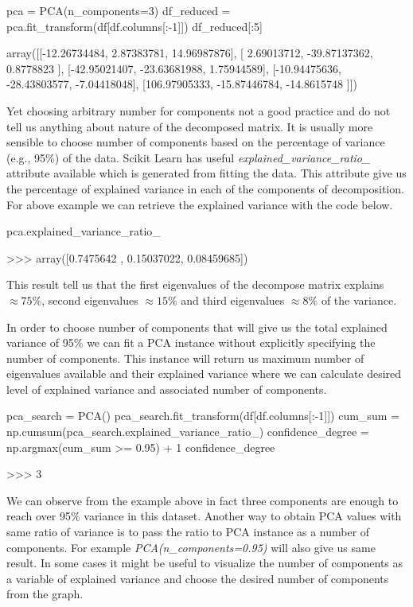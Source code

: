 \documentclass[12pt]{article}
\begin{document}
\begin{python}
    pca = PCA(n_components=3)
    df_reduced = pca.fit_transform(df[df.columns[:-1]])
    df_reduced[:5]

    array([[-12.26734484,   2.87383781,  14.96987876],
       [  2.69013712, -39.87137362,   0.8778823 ],
       [-42.95021407, -23.63681988,   1.75944589],
       [-10.94475636, -28.43803577,  -7.04418048],
       [106.97905333, -15.87446784, -14.8615748 ]])
\end{python}

Yet choosing arbitrary number for components not a good practice and do not tell us anything about nature of the decomposed matrix. It is usually more sensible to choose number of components based on the percentage of variance (e.g., 95\%) of the data. Scikit Learn has useful \textit{explained\_variance\_ratio\_} attribute available which is generated from fitting the data. This attribute give us the percentage of explained variance in each of the components of decomposition. For above example we can retrieve the explained variance with the code below.

\begin{python}
    pca.explained_variance_ratio_

    >>> array([0.7475642 , 0.15037022, 0.08459685])
\end{python}

This result tell us that the first eigenvalues of the decompose matrix explains $\approx 75\%$, second eigenvalues $\approx 15\%$ and third eigenvalues $\approx 8\%$ of the variance.

In order to choose number of components that will give us the total explained variance of 95\% we can fit a PCA instance without explicitly specifying the number of components. This instance will return us maximum number of eigenvalues available and their explained variance where we can calculate desired level of explained variance and associated number of components.

\begin{python}
    pca_search = PCA()
    pca_search.fit_transform(df[df.columns[:-1]])
    cum_sum = np.cumsum(pca_search.explained_variance_ratio_)
    confidence_degree = np.argmax(cum_sum >= 0.95) + 1
    confidence_degree

    >>> 3
\end{python}

We can observe from the example above in fact three components are enough to reach over 95\% variance in this dataset. Another way to obtain PCA values with same ratio of variance is to pass the ratio to PCA instance as a number of components. For example \textit{PCA(n\_components=0.95)} will also give us same result. In some cases it might be useful to visualize the number of components as a variable of explained variance and choose the desired number of components from the graph.
\end{document}
